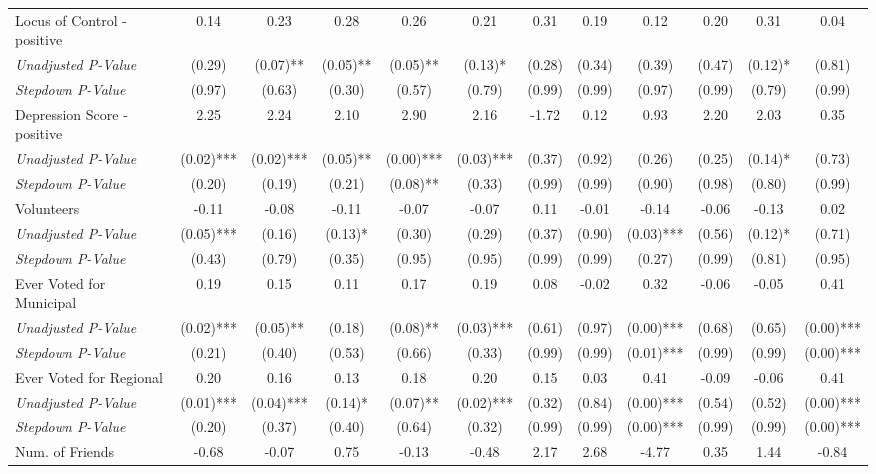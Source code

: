 \begin{tabular}{l c c c c c c c c c c c}
Locus of Control - positive & 0.14 & 0.23 & 0.28 & 0.26 & 0.21 & 0.31 & 0.19 & 0.12 & 0.20 & 0.31 & 0.04 \\
\quad \textit{Unadjusted P-Value} & (0.29) & (0.07)** & (0.05)** & (0.05)** & (0.13)* & (0.28) & (0.34) & (0.39) & (0.47) & (0.12)* & (0.81) \\
\quad \textit{Stepdown P-Value} & (0.97) & (0.63) & (0.30) & (0.57) & (0.79) & (0.99) & (0.99) & (0.97) & (0.99) & (0.79) & (0.99) \\
Depression Score - positive & 2.25 & 2.24 & 2.10 & 2.90 & 2.16 & -1.72 & 0.12 & 0.93 & 2.20 & 2.03 & 0.35 \\
\quad \textit{Unadjusted P-Value} & (0.02)*** & (0.02)*** & (0.05)** & (0.00)*** & (0.03)*** & (0.37) & (0.92) & (0.26) & (0.25) & (0.14)* & (0.73) \\
\quad \textit{Stepdown P-Value} & (0.20) & (0.19) & (0.21) & (0.08)** & (0.33) & (0.99) & (0.99) & (0.90) & (0.98) & (0.80) & (0.99) \\
Volunteers & -0.11 & -0.08 & -0.11 & -0.07 & -0.07 & 0.11 & -0.01 & -0.14 & -0.06 & -0.13 & 0.02 \\
\quad \textit{Unadjusted P-Value} & (0.05)*** & (0.16) & (0.13)* & (0.30) & (0.29) & (0.37) & (0.90) & (0.03)*** & (0.56) & (0.12)* & (0.71) \\
\quad \textit{Stepdown P-Value} & (0.43) & (0.79) & (0.35) & (0.95) & (0.95) & (0.99) & (0.99) & (0.27) & (0.99) & (0.81) & (0.95) \\
Ever Voted for Municipal & 0.19 & 0.15 & 0.11 & 0.17 & 0.19 & 0.08 & -0.02 & 0.32 & -0.06 & -0.05 & 0.41 \\
\quad \textit{Unadjusted P-Value} & (0.02)*** & (0.05)** & (0.18) & (0.08)** & (0.03)*** & (0.61) & (0.97) & (0.00)*** & (0.68) & (0.65) & (0.00)*** \\
\quad \textit{Stepdown P-Value} & (0.21) & (0.40) & (0.53) & (0.66) & (0.33) & (0.99) & (0.99) & (0.01)*** & (0.99) & (0.99) & (0.00)*** \\
Ever Voted for Regional & 0.20 & 0.16 & 0.13 & 0.18 & 0.20 & 0.15 & 0.03 & 0.41 & -0.09 & -0.06 & 0.41 \\
\quad \textit{Unadjusted P-Value} & (0.01)*** & (0.04)*** & (0.14)* & (0.07)** & (0.02)*** & (0.32) & (0.84) & (0.00)*** & (0.54) & (0.52) & (0.00)*** \\
\quad \textit{Stepdown P-Value} & (0.20) & (0.37) & (0.40) & (0.64) & (0.32) & (0.99) & (0.99) & (0.00)*** & (0.99) & (0.99) & (0.00)*** \\
Num. of Friends & -0.68 & -0.07 & 0.75 & -0.13 & -0.48 & 2.17 & 2.68 & -4.77 & 0.35 & 1.44 & -0.84 \\

\end{tabular}
